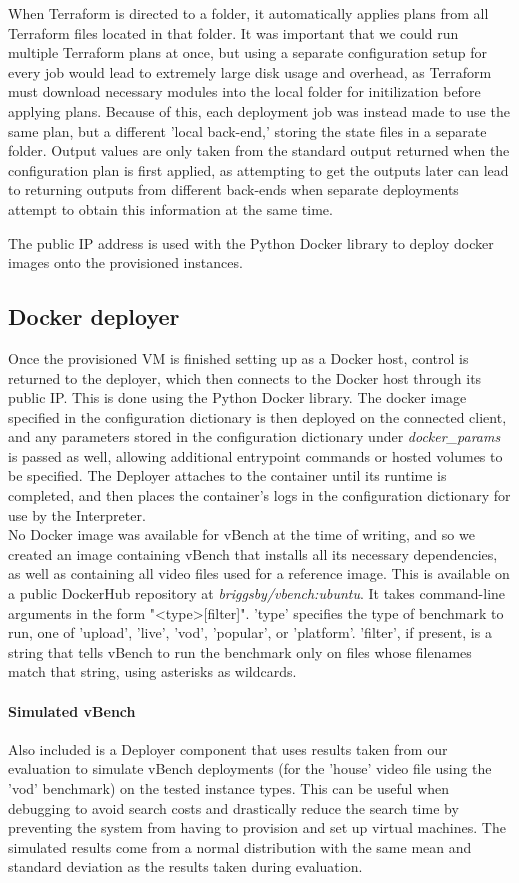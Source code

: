 \documentclass{report}
\begin{document}
When Terraform is directed to a folder, it automatically applies plans from all Terraform files located in that folder. It was important that we could run multiple Terraform plans at once, but using a separate configuration setup for every job would lead to extremely large disk usage and overhead, as Terraform must download necessary modules into the local folder for initilization before applying plans. Because of this, each deployment job was instead made to use the same plan, but a different 'local back-end,' storing the state files in a separate folder. Output values are only taken from the standard output returned when the configuration plan is first applied, as attempting to get the outputs later can lead to returning outputs from different back-ends when separate deployments attempt to obtain this information at the same time.

The public IP address is used with the Python Docker library to deploy docker images onto the provisioned instances.
\subsection{Docker deployer}
Once the provisioned VM is finished setting up as a Docker host, control is returned to the deployer, which then connects to the Docker host through its public IP. This is done using the Python Docker library. The docker image specified in the configuration dictionary is then deployed on the connected client, and any parameters stored in the configuration dictionary under \textit{docker\_params} is passed as well, allowing additional entrypoint commands or hosted volumes to be specified. The Deployer attaches to the container until its runtime is completed, and then places the container's logs in the configuration dictionary for use by the Interpreter. \\
No Docker image was available for vBench at the time of writing, and so we created an image containing vBench that installs all its necessary dependencies, as well as containing all video files used for a reference image. This is available on a public DockerHub repository at \textit{briggsby/vbench:ubuntu}. It takes command-line arguments in the form "\textless type\textgreater [filter]". 'type' specifies the type of benchmark to run, one of 'upload', 'live', 'vod', 'popular', or 'platform'. 'filter', if present, is a string that tells vBench to run the benchmark only on files whose filenames match that string, using asterisks as wildcards.

\paragraph{Simulated vBench}
Also included is a Deployer component that uses results taken from our evaluation to simulate vBench deployments (for the 'house' video file using the 'vod' benchmark) on the tested instance types. This can be useful when debugging to avoid search costs and drastically reduce the search time by preventing the system from having to provision and set up virtual machines. The simulated results come from a normal distribution with the same mean and standard deviation as the results taken during evaluation.
\end{document}
